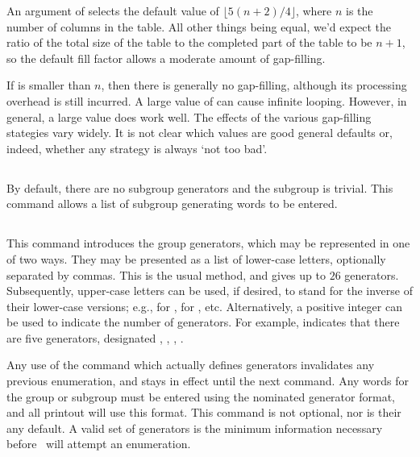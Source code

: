 An argument of  selects the default value of
  $\lfloor 5(n+2)/4 \rfloor$, where $n$ is the number of columns in the
  table.
All other things being equal, we'd expect the ratio of the total size
  of the table to the completed part of the table to be $n+1$, so the 
  default fill factor allows a moderate amount of gap-filling.

If  is smaller than $n$, then there is generally no gap-filling,
  although its processing overhead is still incurred.
A large value of  can cause infinite looping.
However, in general, a large value does work well.
The effects of the various gap-filling stategies vary widely.  
It is not clear which values are good general defaults or, indeed, whether
  any strategy is always `not too bad'\kern-1.5pt.

\subsection{}

By default, there are no subgroup generators and the subgroup is trivial.
This command allows a list of subgroup generating words to be entered.

\subsection{}
  \label{sec:groupgen}

This command introduces the group generators, which may be represented in
  one of two ways.
They may be presented as a list of lower-case letters, optionally
  separated by commas.
This is the usual method, and gives up to $26$ generators.
Subsequently, upper-case letters can be used, if desired, to stand for the
  inverse of their lower-case versions; 
  e.g.,  for ,  for , etc.
Alternatively, a positive integer can be used to indicate the number of
  generators.
For example,  indicates that there are five generators, 
  designated \ttt{1}, \ttt{2}, \ttt{3}, \ttt{4} \amp \ttt{5}.

Any use of the  command which actually defines generators
  invalidates any previous enumeration, and stays in effect until the next
  \ttt{gr} command.
Any words for the group or subgroup must be entered using the nominated
  generator format, and all printout will use this format.
%
This command is not optional, nor is their any default.
A valid set of generators is the minimum information necessary before
  \ace\ will attempt an enumeration.

